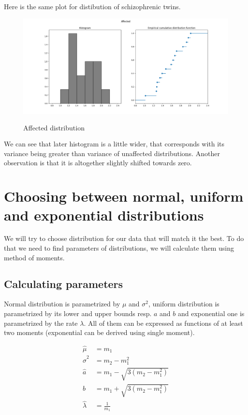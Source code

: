 \documentclass[12pt,a4paper]{article} %
\begin{document}
Here is the same plot for distibution of schizophrenic twins.
\begin{figure}[h]
  \centering
  \includegraphics[scale=0.4]{./img/affected_hist_ecdf.png}
  \label{fig:aff_ecdf}
  \caption{Affected distribution}
\end{figure}

We can see that later histogram is a little wider, that corresponds with its variance being greater than variance of unaffected distributions. Another observation is that it is altogether slightly shifted towards zero.

\section{Choosing between normal, uniform and exponential distributions}

We will try to choose distribution for our data that will match it the best. To do that we need to find parameters of distributions, we will calculate them using method of moments. %

\subsection{Calculating parameters}

Normal distribution is parametrized by $\mu$ and $\sigma^2$, uniform distribution is parametrized by its lower and upper bounds resp. $a$ and $b$ and exponential one is parametrized by the rate $\lambda$. All of them can be expressed as functions of at least two moments (exponential can be derived using single moment).

\begin{align*}
  \hat \mu &= m_1 \\
  \hat \sigma^2 &= m_2 - m_1^2 \\
  \hat a &= m_1 - \sqrt{3(m_2 - m_1^2)}\\ 
  \hat b &= m_1 + \sqrt{3(m_2 - m_1^2)}\\ 
  \hat \lambda &= \frac{1}{m_1}
\end{align*}
\end{document}
